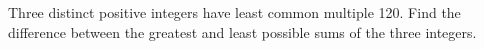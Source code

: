 Three distinct positive integers have least common multiple 120. Find the difference between the greatest and least possible sums of the three integers.
